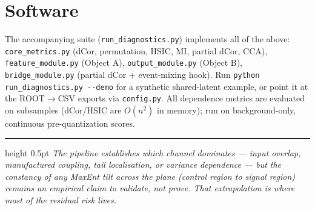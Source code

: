 \documentclass[11pt]{article}
\begin{document}
\section{Software}
The accompanying suite (\texttt{run\_diagnostics.py}) implements all of the
above: \texttt{core\_metrics.py} (dCor, permutation, HSIC, MI, partial dCor,
CCA), \texttt{feature\_module.py} (Object A), \texttt{output\_module.py}
(Object B), \texttt{bridge\_module.py} (partial dCor + event-mixing hook). Run
\texttt{python run\_diagnostics.py -{}-demo} for a synthetic shared-latent
example, or point it at the ROOT$\to$CSV exports via \texttt{config.py}. All
dependence metrics are evaluated on subsamples (dCor/HSIC are $O(n^2)$ in
memory); run on background-only, continuous pre-quantization scores.

\vspace{0.6em}\hrule height 0.5pt \vspace{0.4em}
{\footnotesize\itshape The pipeline establishes which channel dominates ---
input overlap, manufactured coupling, tail localisation, or variance dependence
--- but the constancy of any MaxEnt tilt across the plane (control region to
signal region) remains an empirical claim to validate, not prove. That
extrapolation is where most of the residual risk lives.}
\end{document}
